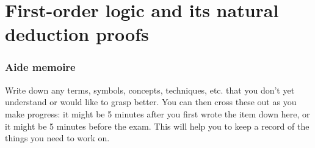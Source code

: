 \documentclass[a4paper]{article}
\theoremstyle{definition}
\begin{document}


\part{First-order logic and its natural deduction
  proofs}
\setcounter{section}{0}



\newpage
\thispagestyle{empty}

\section*{Aide memoire}

\noindent
Write down any terms, symbols, concepts, techniques, etc. that
you don't yet understand or would like to grasp better.
You can then cross these out as you make progress:
it might be 5 minutes after you first wrote the
item down here, or it might be 5 minutes before the exam.
This will help you to keep a record of the things you
need to work on. \\[0.5em]
\end{document}
